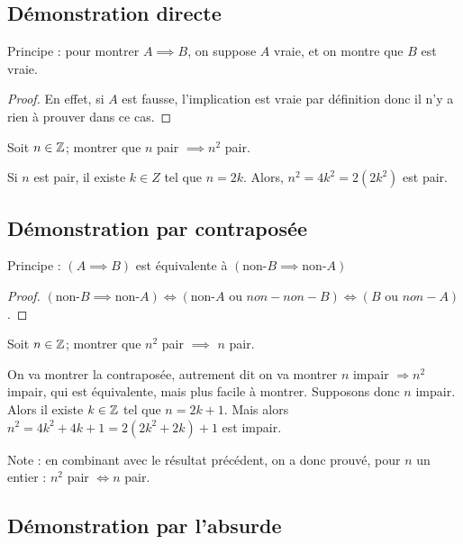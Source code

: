 {\subsection{Démonstration directe}

Principe : pour montrer $A\implies B$, on suppose $A$ vraie, et on montre que $B$ est vraie.

\begin{proof}
En effet, si $A$ est fausse, l'implication est vraie par définition donc il n'y a rien à prouver dans ce cas.
\end{proof}

\begin{exemple}
Soit $n \in \mathbb{Z}$; montrer que \og $n$ pair $\implies n^2$ pair\fg.
\begin{red}
Si $n$ est pair, il existe $k \in Z$ tel que $n = 2k$. Alors, $n^2 = 4k^2 = 2(2k^2)$ est pair.
\end{red}
\end{exemple}

\subsection{Démonstration par contraposée}

Principe : $(A\implies B)$ est équivalente à $(\text{non-}B \implies \text{non-}A)$

\begin{proof}
$(\text{non-}B \implies \text{non-}A)\iff (\text{non-}A \text{ ou } non-non-B)\iff (B\text{ ou }non-A)$.
\end{proof}

\begin{exemple}
Soit $n\in \mathbb{Z}$; montrer que $n^2$ pair $\implies$ $n$ pair.
\begin{red}
On va montrer la contraposée, autrement dit on va montrer 
\og $n$ impair $\Rightarrow n^2$ impair\fg, qui est équivalente, mais plus facile à montrer. Supposons donc $n$ impair. Alors il existe $k \in\mathbb{Z}$ tel que $n = 2k+1$. Mais alors $n^2 = 4k^2+4k+1 = 2(2k^2+2k)+1$ est impair.\\
\end{red}
\end{exemple}

Note : en combinant avec le résultat précédent, on a donc prouvé, pour $n$ un entier : \og$n^2$ pair $\iff n$ pair.\fg

\subsection{Démonstration par l'absurde}

}
